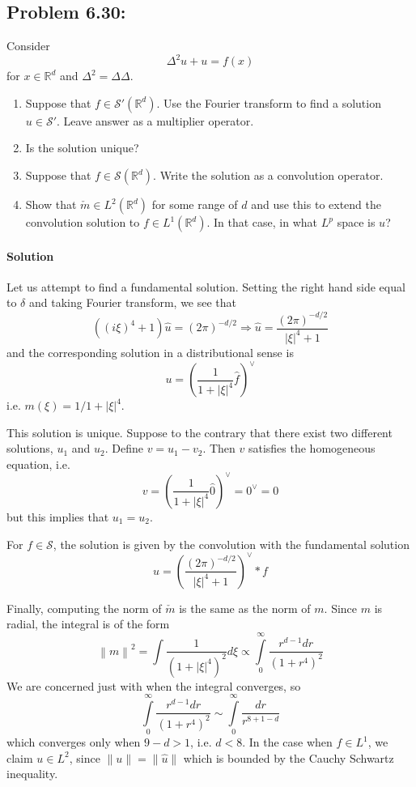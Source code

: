 \documentclass[letterpaper,twoside,11pt]{article}
\theoremstyle{mystyle}
\newcommand{\R}{{\mathbb R}}
\newcommand{\sch}{\mathcal S}
\begin{document}
\subsection*{Problem 6.30:}
Consider 
\[\Delta^2 u + u = f(x)\] 
for $x\in \R^d$ and $\Delta^2 = \Delta\Delta$. 
\begin{enumerate}
  \item Suppose that $f \in \sch ' \left( \R^d  \right)$. Use the Fourier transform to find a solution $u \in \sch'$. Leave answer as a multiplier operator. 
  \item Is the solution unique? 
  \item Suppose that $f \in \sch \left( \R^d  \right)$. Write the solution as a convolution operator. 
  \item Show that $\check{m}\in L^2 \left( \R^d \right)$ for some range of $d$ and use this to extend the convolution solution to $f\in L^1\left( \R^d \right)$. In that case, in what $L^p$ space is $u$? 
\end{enumerate}

\paragraph*{Solution} Let us attempt to find a fundamental solution. Setting the right hand side equal to $\delta$ and taking Fourier transform, we see that 
\[\left( {{{\left( {i\xi } \right)}^4} + 1} \right)\hat u = {\left( {2\pi } \right)^{ - d/2}} \Rightarrow \hat u = \frac{{{{\left( {2\pi } \right)}^{ - d/2}}}}{{{{\left| \xi  \right|}^4} + 1}}\] and the corresponding solution in a distributional sense is 
\[u = {\left( {\frac{1}{{1 + {{\left| \xi  \right|}^4}}}\hat f} \right)^ \vee }\]
i.e. $m(\xi) = 1/1+|\xi|^4$. 

This solution is unique. Suppose to the contrary that there exist two different solutions, $u_1$ and $u_2$. Define $v = u_1 - v_2$. Then $v$ satisfies the homogeneous equation, i.e. 
\[v = {\left( {\frac{1}{{1 + {{\left| \xi  \right|}^4}}}\hat 0} \right)^ \vee } = {0^ \vee } = 0\]
but this implies that $u_1 = u_2$. 

For $f \in \sch$, the solution is given by the convolution with the fundamental solution
\[u = {\left( {\frac{{{{\left( {2\pi } \right)}^{ - d/2}}}}{{{{\left| \xi  \right|}^4} + 1}}} \right)^ \vee } * f\]

Finally, computing the norm of $\check m$ is the same as the norm of $m$. Since $m$ is radial, the integral is of the form 
\[{\left\| m \right\|^2} = \int {\frac{1}{{{{\left( {1 + {{\left| \xi  \right|}^4}} \right)}^2}}}d\xi }  \propto \int\limits_0^\infty  {\frac{{{r^{d - 1}}dr}}{{{{\left( {1 + {r^4}} \right)}^2}}}} \]
We are concerned just with when the integral converges, so 
\[\int\limits_0^\infty  {\frac{{{r^{d - 1}}dr}}{{{{\left( {1 + {r^4}} \right)}^2}}}} \sim\int\limits_0^\infty  {\frac{{dr}}{{{r^{8 + 1 - d}}}}} \]
which converges only when $9-d>1$, i.e. $d<8$. In the case when $f \in L^1$, we claim $u\in L^2$, since $\|u\|= \|\hat u \|$ which is bounded by the Cauchy Schwartz inequality. 
\end{document}
